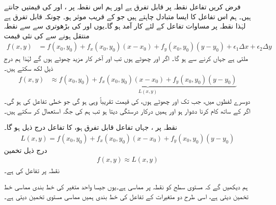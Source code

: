 فرض کریں   تفاعل  نقطہ  پر  قابل تفرق ہے  اور ہم اس نقطہ پر     ،  اور  کی  قیمتیں  جانتے ہیں۔ ہم  اس تفاعل کا ایسا متبادل  چاہتے ہیں جو      کے قریب  موثر ہو۔ چونکہ  قابل تفرق ہے لہٰذا نقطہ  پر مساوات   تفاعل  کے لئے کار آمد ہو گا۔یوں  اور  کی بڑھوتری  سے    سے نقطہ    منتقل ہونے سے  کی نئی قیمت
\begin{align*}
f(x,y)&=f(x_0,y_0)+f_x(x_0,y_0)(x-x_0)+f_y(x_0,y_0)(y-y_0)+\epsilon_1\Delta x+\epsilon_2\Delta y
\end{align*}
ملتی ہے جہاں  کرنے سے  ہو گا۔ اگر  اور  چھوٹے ہوں تب  اور  آخر کار مزید چھوٹے ہوں گے لہٰذا ہم درج ذیل لکھ سکتے ہیں۔
\begin{align*}
f(x,y)&\approx \underbrace{f(x_0,y_0)+f_x(x_0,y_0)(x-x_0)+f_y(x_0,y_0)(y-y_0)}_{L(x,y)}
\end{align*}
دوسرے لفظوں میں، جب تک  اور  چھوٹے ہوں،  کی قیمت تقریباً وہی ہو گی جو خطی تفاعل  کی ہو گی۔ اگر  کے ساتھ کام کرنا دشوار ہو اور  ہمیں درکار درستگی دیتا ہو تب ہم  کی جگہ  استعمال کر سکتے ہیں۔

نقطہ پر  ،  جہاں تفاعل  قابل تفرق ہو،  کا تفاعل درج ذیل ہو گا۔
\begin{align}\label{مساوات_کثیرالمتغیر_خط_بند_تخمین}
L(x,y)=f(x_0,y_0)+f_x(x_0,y_0)(x-x_0)+f_y(x_0,y_0)(y-y_0)
\end{align}
درج ذیل  تخمین
\begin{align*}
f(x,y)\approx L(x,y)
\end{align*}
  نقطہ  پر تفاعل   کی  ہے۔ 

ہم دیکھیں گے کہ مستوی  سطح  کو  نقطہ  پر مماسی ہے۔یوں  جیسا واحد متغیر کی خط بندی مماسی خط تخمین دیتی ہے، اسی طرح  دو متغیرات کے تفاعل کی خط بندی ہمیں مماسی مستوی  تخمین دیتی ہے۔

